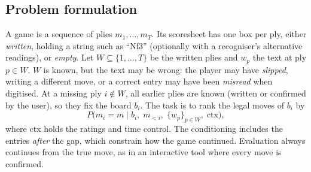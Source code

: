 \documentclass[11pt]{article}
\begin{document}


\subsection{Problem formulation}
\label{sec:formulation}
A game is a sequence of plies $m_1,\dots,m_T$. Its scoresheet has one box per ply, either \emph{written}, holding a string such as ``Nf3'' (optionally with a recogniser's alternative readings), or \emph{empty}. Let $W\subseteq\{1,\dots,T\}$ be the written plies and $w_p$ the text at ply $p\in W$. $W$ is known, but the text may be wrong: the player may have \emph{slipped}, writing a different move, or a correct entry may have been \emph{misread} when digitised.
At a missing ply $i\notin W$, all earlier plies are known (written or confirmed by the user), so they fix the board $b_i$. The task is to rank the legal moves of $b_i$ by
\[
P\big(m_i=m \;\big|\; b_i,\; m_{<i},\; \{w_p\}_{p\in W},\; \text{ctx}\big),
\]
where ctx holds the ratings and time control. The conditioning includes the entries \emph{after} the gap, which constrain how the game continued. Evaluation always continues from the true move, as in an interactive tool where every move is confirmed.
\end{document}
